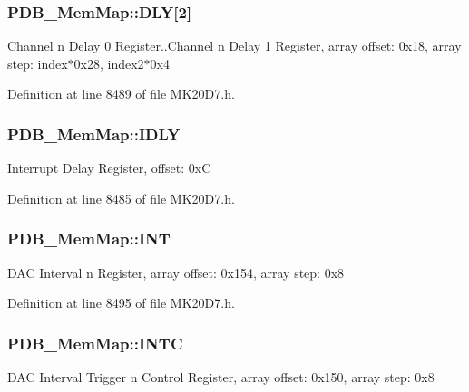 \subsubsection[{\texorpdfstring{D\+LY}{DLY}}]{ P\+D\+B\+\_\+\+Mem\+Map\+::\+D\+LY\mbox{[}2\mbox{]}}\hypertarget{struct_p_d_b___mem_map_a101a3b427fd438fc5dd9069f9d3f31d6}{}\label{struct_p_d_b___mem_map_a101a3b427fd438fc5dd9069f9d3f31d6}
Channel n Delay 0 Register..Channel n Delay 1 Register, array offset\+: 0x18, array step\+: index$\ast$0x28, index2$\ast$0x4 

Definition at line 8489 of file M\+K20\+D7.\+h.

\subsubsection[{\texorpdfstring{I\+D\+LY}{IDLY}}]{ P\+D\+B\+\_\+\+Mem\+Map\+::\+I\+D\+LY}\hypertarget{struct_p_d_b___mem_map_abbda47481fef54f3ab340fec07c8b809}{}\label{struct_p_d_b___mem_map_abbda47481fef54f3ab340fec07c8b809}
Interrupt Delay Register, offset\+: 0xC 

Definition at line 8485 of file M\+K20\+D7.\+h.

\subsubsection[{\texorpdfstring{I\+NT}{INT}}]{ P\+D\+B\+\_\+\+Mem\+Map\+::\+I\+NT}\hypertarget{struct_p_d_b___mem_map_a94d5425758d6d4b2d3141a05603ff7d1}{}\label{struct_p_d_b___mem_map_a94d5425758d6d4b2d3141a05603ff7d1}
D\+AC Interval n Register, array offset\+: 0x154, array step\+: 0x8 

Definition at line 8495 of file M\+K20\+D7.\+h.

\subsubsection[{\texorpdfstring{I\+N\+TC}{INTC}}]{ P\+D\+B\+\_\+\+Mem\+Map\+::\+I\+N\+TC}\hypertarget{struct_p_d_b___mem_map_a37fb3d809a70ce9bd67dcc87483064c5}{}\label{struct_p_d_b___mem_map_a37fb3d809a70ce9bd67dcc87483064c5}
D\+AC Interval Trigger n Control Register, array offset\+: 0x150, array step\+: 0x8 

